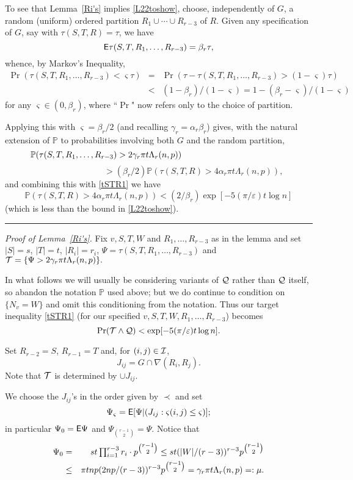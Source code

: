 \documentclass[letterpaper,11pt]{article}
\newcommand{\beq}[1]{\begin{equation}\label{#1}}
\newcommand{\enq}[0]{\end{equation}}
\newcommand{\mn}[0]{\medskip\noindent}
\renewcommand{\dots}[0]{,\ldots,}
\newcommand{\I}[0]{{\cal I}}
\newcommand{\Q}[0]{{\cal Q}}
\newcommand{\T}[0]{{\cal T}}
\newcommand{\PPP}[0]{\mathbb P}
\newcommand{\0}[0]{\emptyset}
\renewcommand{\qed}[0]{\begin{flushright} \rule{2mm}{3mm} \end{flushright}}
\newcommand{\C}[2]{{{#1}\choose{{#2}}}}
\newcommand{\Cc}[0]{\tbinom}
\newcommand{\ga}[0]{\alpha }
\newcommand{\gb}[0]{\beta }
\newcommand{\gc}[0]{\gamma }
\newcommand{\gL}[0]{\Lambda}
\newcommand{\eps}[0]{\varepsilon }
\newcommand{\vs}[0]{\varsigma}
\begin{document}
\medskip
To see that Lemma~\ref{Ri's} implies
\eqref{L22toshow},
choose, independently of $G$,
a random (uniform) ordered partition
$R_1\cup\cdots \cup R_{r-3}$ of $R$.
%
%
Given any specification of $G$, say with $\tau(S,T,R)=\tau$,
we have
\[\E\tau(S,T,R_1\dots R_{r-3}) = \gb_r\tau,\]
%
whence, by Markov's Inequality,
\begin{eqnarray*}
\Pr(\tau(S,T,R_1\dots R_{r-3})<\vs\tau)
&=&
\Pr(\tau-\tau(S,T,R_1\dots R_{r-3})> (1-\vs)\tau)\\
&<& (1-\gb_r)/(1-\vs) = 1 - (\gb_r-\vs)/(1-\vs)
\end{eqnarray*}
for any $\vs\in (0,\gb_r)$,
where ``$\Pr$" now refers only to the choice of partition.


Applying this with $\vs =\gb_r/2$ (and recalling $\gc_r=\ga_r\gb_r$)
gives,
with the natural extension of $\PPP$
to probabilities involving both $G$ and the random
partition,
\[
\mbox{$\PPP(\tau(S,T,R_1\dots R_{r-3})$} >
\mbox{$ 2\gc_r\pi t \gL_r(n,p))$}
~~~~~~~~~~~~~~~~~~~~~~~~~~~~~~~~~~~~~
\]
\[
~~~~~~~~~~~~~~~~~~~~~~~~~~~~~~~~~~~~~
> \mbox{$(\gb_r/2)
\PPP(\tau(S,T,R) > 4\ga_r\pi t \gL_r(n,p))$},
\]
and combining this with \eqref{tSTR1} we have
\[
\mbox{$\PPP(\tau(S,T,R) > 4\ga_r\pi t \gL_r(n,p))
< (2/\gb_r) \exp[-5 (\pi/\eps)t\log n]$}
\]
(which is less than the bound in \eqref{L22toshow}).
\qed






\mn
{\em Proof of Lemma~\ref{Ri's}.}
Fix
$v,S,T,W $ and $R_1\dots R_{r-3}$ as in the lemma
and
set $|S|=s$, $|T|=t$, $|R_i|=r_i$,
$\Psi=\tau(S,T,R_1\dots R_{r-3})$ and
$
\T =\{\Psi > 2\gc_r\pi t \gL_r(n,p)\}.
$

In what follows we will usually be considering
variants of $\Q$ rather than $\Q$ itself, so
abandon the notation $\PPP$ used above; but
we do continue to condition
on $\{N_v=W\}$ and omit this conditioning from the notation.
Thus our target inequality
\eqref{tSTR1} (for our specified $v,S,T,W ,R_1\dots R_{r-3}$)
becomes
\beq{sSTR2}
\Pr(\T\wedge \Q)< \exp[-5 (\pi/\eps)t\log n].
\enq




\medskip
Set $R_{r-2}=S$, $R_{r-1}=T$
and, for $(i,j)\in \I$,
\[
J_{ij} =G\cap \nabla(R_i,R_j).
\]
Note that $\T$ is determined by
$\cup J_{ij}$.


%
We choose the $J_{ij}$'s in the order given by $\prec$
and set
\[\Psi_\vs=\E[\Psi|(J_{ij}:\vs(i,j)\leq \vs)];\]
%
in particular $\Psi_0={\sf E} \Psi$
and $\Psi_{\C{r-1}{2}}=\Psi$.
Notice that
\begin{eqnarray}
\Psi_0 &=&
\mbox{$st\prod_{i=1}^{r-3}r_i\cdot p^{\Cc{r-1}{2}}$}
\leq
st(|W|/(r-3))^{r-3}p^{\Cc{r-1}{2}}\nonumber\\
&\leq&
\pi tnp(2np/(r-3))^{r-3}p^{\Cc{r-1}{2}}
= \gc_r \pi t\gL_r(n,p) =:\mu. \label{Psi0}
\end{eqnarray}
\end{document}
